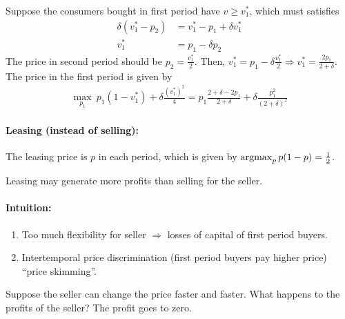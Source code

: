 \documentclass[11pt]{elegantbook}
\newcommand{\argmax}{\operatornamewithlimits{argmax}}
\begin{document}
Suppose the consumers bought in first period have $v\geq v_1^*$, which must satisfies
\begin{equation}
    \begin{aligned}
        \delta (v_1^* - p_2)&= v_1^* - p_1 + \delta v_1^*\\
        v_1^*&=p_1-\delta p_2
    \end{aligned}
    \nonumber
\end{equation}
The price in second period should be $p_2=\frac{v_1^*}{2}$. Then, $v_1^*=p_1-\delta \frac{v_1^*}{2} \Rightarrow v_1^*=\frac{2p_1}{2+\delta}$. The price in the first period is given by
\begin{equation}
    \begin{aligned}
        \max_{p_1}\ p_1(1-v_1^*)+\delta \frac{(v_1^*)^2}{4}=p_1\frac{2+\delta-2p_1}{2+\delta}+\delta \frac{p_1^2}{(2+\delta)^2}
    \end{aligned}
    \nonumber
\end{equation}

\paragraph*{Leasing (instead of selling):} The leasing price is $p$ in each period, which is given by $\argmax_p p(1-p)=\frac{1}{2}$.

Leasing may generate more profits than selling for the seller.

\paragraph*{Intuition:}
\begin{enumerate}
    \item Too much flexibility for seller $\Rightarrow$ losses of capital of first period buyers.
    \item Intertemporal price discrimination (first period buyers pay higher price) ``price skimming''.
\end{enumerate}
\begin{theorem}
    Suppose the seller can change the price faster and faster. What happens to the profits of the seller? The profit goes to zero.
\end{theorem}
\end{document}
